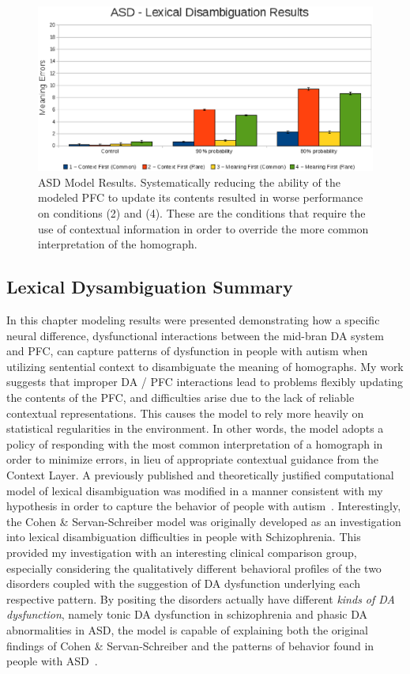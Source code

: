 \documentclass[man]{apa}
\begin{document}
\begin{figure}[tp]
\begin{center}
	\includegraphics[width=140mm]{graphs/asd_lexamb_results.eps}
\end{center}
\caption{ASD Model Results. Systematically reducing the ability of the modeled PFC to update its contents resulted in worse performance on conditions (2) and (4).  These are the conditions that require the use of contextual information in order to override the more common interpretation of the homograph. } 
\label{ASD-Amb-Results}
\end{figure} 

\subsection{Lexical Dysambiguation Summary}
In this chapter modeling results were presented demonstrating how a specific neural difference, dysfunctional interactions between the mid-bran DA system and PFC, can capture patterns of dysfunction in people with autism when utilizing sentential context to disambiguate the meaning of homographs.  My work suggests that improper DA / PFC interactions lead to problems flexibly updating the contents of the PFC, and difficulties arise due to the lack of reliable contextual representations.  This causes the model to rely more heavily on statistical regularities in the environment.  In other words, the model adopts a policy of responding with the most common interpretation of a homograph in order to minimize errors, in lieu of appropriate contextual guidance from the Context Layer.  A previously published and theoretically justified computational model of lexical disambiguation was modified in a manner consistent with my hypothesis in order to capture the behavior of people with autism~\cite{CohenJD:1992:Schizophrenia}.  Interestingly, the Cohen \& Servan-Schreiber model was originally developed as an investigation into lexical disambiguation difficulties in people with Schizophrenia.  This provided my investigation with an interesting clinical comparison group, especially considering the qualitatively different behavioral profiles of the two disorders coupled with the suggestion of DA dysfunction underlying each respective pattern.  By positing the disorders actually have different \emph{kinds of DA dysfunction}, namely tonic DA dysfunction in schizophrenia and phasic DA abnormalities in ASD, the model is capable of explaining both the original findings of Cohen \& Servan-Schreiber and the patterns of behavior found in people with ASD~\cite{RefWorks:103,HappeF:1997:WCC_Homographs}.  
\end{document}
